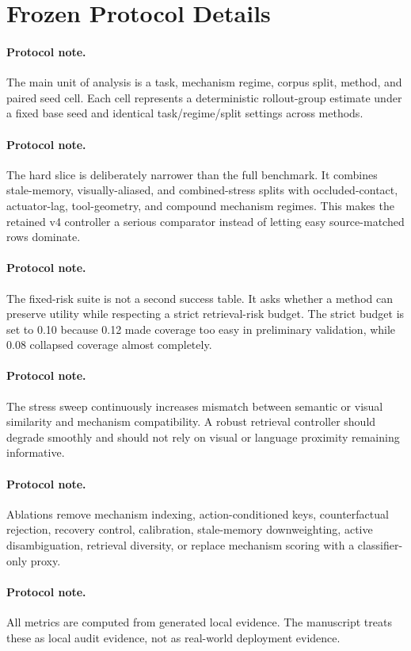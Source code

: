 \documentclass{article}
\begin{document}
\section{Frozen Protocol Details}
\paragraph{Protocol note.} The main unit of analysis is a task, mechanism regime, corpus split, method, and paired seed cell. Each cell represents a deterministic rollout-group estimate under a fixed base seed and identical task/regime/split settings across methods.
\paragraph{Protocol note.} The hard slice is deliberately narrower than the full benchmark. It combines stale-memory, visually-aliased, and combined-stress splits with occluded-contact, actuator-lag, tool-geometry, and compound mechanism regimes. This makes the retained v4 controller a serious comparator instead of letting easy source-matched rows dominate.
\paragraph{Protocol note.} The fixed-risk suite is not a second success table. It asks whether a method can preserve utility while respecting a strict retrieval-risk budget. The strict budget is set to 0.10 because 0.12 made coverage too easy in preliminary validation, while 0.08 collapsed coverage almost completely.
\paragraph{Protocol note.} The stress sweep continuously increases mismatch between semantic or visual similarity and mechanism compatibility. A robust retrieval controller should degrade smoothly and should not rely on visual or language proximity remaining informative.
\paragraph{Protocol note.} Ablations remove mechanism indexing, action-conditioned keys, counterfactual rejection, recovery control, calibration, stale-memory downweighting, active disambiguation, retrieval diversity, or replace mechanism scoring with a classifier-only proxy.
\paragraph{Protocol note.} All metrics are computed from generated local evidence. The manuscript treats these as local audit evidence, not as real-world deployment evidence.
\end{document}
